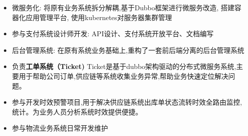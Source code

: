\documentclass{resume}
\begin{document}
\begin{itemize}
  \item 微服务化: 将原有业务系统拆分解耦,基于Dubbo框架进行微服务改造, 搭建容器化应用管理平台, 使用kubernetes对服务器集群管理
  \item 参与支付系统设计师开发: API设计、支付系统开放平台、文档编写
  \item 后台管理系统: 在原有系统业务基础上,重构了一套前后端分离的后台管理系统
\end{itemize}

\begin{itemize}
  \item 负责\textbf{工单系统（Ticket)} {Ticket是基于dubbo架构驱动的分布式微服务系统,主要用于帮助公司订单,供应链等系统收集业务异常,帮助业务快速定位解决问题。}
  \item 参与开发时效预警项目,用于解决供应链系统出库单状态流转时效全路由监控,统计。为业务人员分析系统时效提供便捷。
\end{itemize}

\begin{itemize}
  \item 参与物流业务系统日常开发维护
\end{itemize}

%
%
\end{document}
